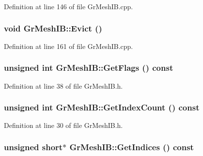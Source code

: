 Definition at line 146 of file GrMeshIB.cpp.\hypertarget{class_gr_mesh_i_b_eb54e94dcc677dc3e11388a9748dca1c}{
\subsubsection[{Evict}]{\setlength{\rightskip}{0pt plus 5cm}void GrMeshIB::Evict ()}}
\label{class_gr_mesh_i_b_eb54e94dcc677dc3e11388a9748dca1c}




Definition at line 161 of file GrMeshIB.cpp.\hypertarget{class_gr_mesh_i_b_2742f129215e216397af17d54d7f30e9}{
\subsubsection[{GetFlags}]{\setlength{\rightskip}{0pt plus 5cm}unsigned int GrMeshIB::GetFlags () const}}
\label{class_gr_mesh_i_b_2742f129215e216397af17d54d7f30e9}




Definition at line 38 of file GrMeshIB.h.\hypertarget{class_gr_mesh_i_b_bc4d48c0654e6fef9dd839470e3acb1e}{
\subsubsection[{GetIndexCount}]{\setlength{\rightskip}{0pt plus 5cm}unsigned int GrMeshIB::GetIndexCount () const}}
\label{class_gr_mesh_i_b_bc4d48c0654e6fef9dd839470e3acb1e}




Definition at line 30 of file GrMeshIB.h.\hypertarget{class_gr_mesh_i_b_b4046ea06d52f723bcbe47f3bf6e144a}{
\subsubsection[{GetIndices}]{\setlength{\rightskip}{0pt plus 5cm}unsigned short$\ast$ GrMeshIB::GetIndices () const}}
\label{class_gr_mesh_i_b_b4046ea06d52f723bcbe47f3bf6e144a}




